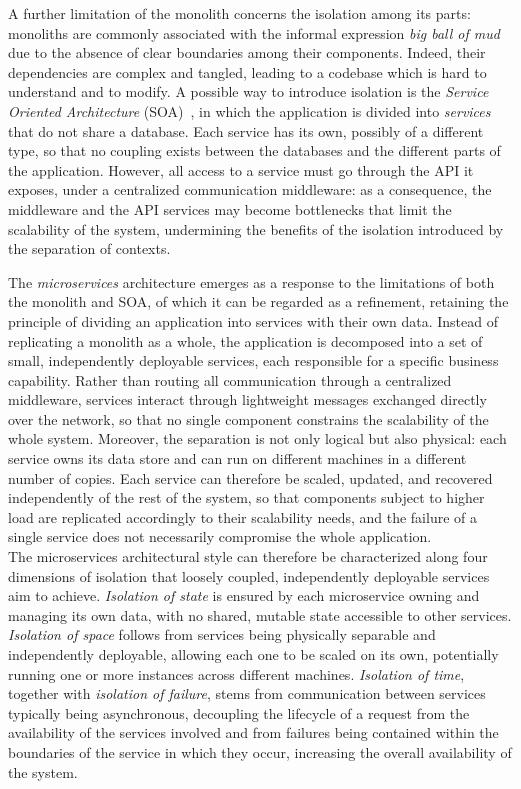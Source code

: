 A further limitation of the monolith concerns the isolation among its parts:
monoliths are commonly associated with the informal expression \textit{big ball
of mud} due to the absence of clear boundaries among their components. Indeed,
their dependencies are complex and tangled, leading to a codebase which is hard
to understand and to modify. A possible way to introduce isolation is the
\textit{Service Oriented Architecture} (SOA)~\cite{erl2005service}, in which the
application is divided into \textit{services} that do not share a database. Each
service has its own, possibly of a different type, so that no coupling exists
between the databases and the different parts of the application. However, all
access to a service must go through the API it exposes, under a centralized
communication middleware: as a consequence, the middleware and the API services
may become bottlenecks that limit the scalability of the system, undermining the
benefits of the isolation introduced by the separation of contexts. 

The \textit{microservices} architecture emerges as a response to the limitations
of both the monolith and SOA, of which it can be regarded as a refinement,
retaining the principle of dividing an application into services with their own
data. Instead of replicating a monolith as a whole, the application is
decomposed into a set of small, independently deployable services, each
responsible for a specific business capability. Rather than routing all
communication through a centralized middleware, services interact through
lightweight messages exchanged directly over the network, so that no single
component constrains the scalability of the whole system. Moreover, the
separation is not only logical but also physical: each service owns its data
store and can run on different machines in a different number of copies. Each
service can therefore be scaled, updated, and recovered independently of the
rest of the system, so that components subject to higher load are replicated
accordingly to their scalability needs, and the failure of a single service does
not necessarily compromise the whole application. \\

The microservices architectural style can therefore be characterized along four
dimensions of isolation that loosely coupled, independently deployable
services aim to achieve. \textit{Isolation of state} is ensured by each
microservice owning and managing its own data, with no shared, mutable state
accessible to other services. \textit{Isolation of space} follows from
services being physically separable and independently deployable, allowing
each one to be scaled on its own, potentially running one or more instances
across different machines. \textit{Isolation of time}, together with
\textit{isolation of failure}, stems from communication between services
typically being asynchronous, decoupling the lifecycle of a request from the
availability of the services involved and from failures being contained
within the boundaries of the service in which they occur, increasing the
overall availability of the system.

